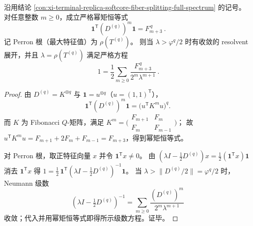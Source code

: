 \begin{conclusion}\label{con:xi-terminal-replica-softcore-fib-moment-and-perron-series}
沿用结论 \ref{con:xi-terminal-replica-softcore-fiber-splitting-full-spectrum} 的记号。
对任意整数 \(m\ge 0\)，成立严格幂矩恒等式
\[
\boxed{\ \mathbf{1}^{\mathsf T}(D^{(q)})^{m}\mathbf{1}=F_{m+3}^{\,q}\ }.
\]
记 Perron 根（最大特征值）为 \(\rho(T^{(q)})\)。
则当 \(\lambda>\varphi^{q}/2\) 时有收敛的 resolvent 展开，并且 \(\lambda=\rho(T^{(q)})\) 满足严格方程
\[
\boxed{\ 1=\frac12\sum_{m\ge 0}\frac{F_{m+3}^{\,q}}{2^{m}\lambda^{m+1}}\ } .
\]
\end{conclusion}
\begin{proof}
由 \(D^{(q)}=K^{\otimes q}\) 与 \(\mathbf{1}=u^{\otimes q}\)（\(u=(1,1)^{\mathsf T}\)），
\[
\mathbf{1}^{\mathsf T}(D^{(q)})^{m}\mathbf{1}
=\bigl(u^{\mathsf T}K^{m}u\bigr)^q.
\]
而 \(K\) 为 Fibonacci \(Q\)-矩阵，满足
\(
K^{m}=\bigl(\begin{smallmatrix}F_{m+1}&F_m\\ F_m&F_{m-1}\end{smallmatrix}\bigr)
\)；
故 \(u^{\mathsf T}K^{m}u=F_{m+1}+2F_m+F_{m-1}=F_{m+3}\)，得到幂矩恒等式。
\par
对 Perron 根，取正特征向量 \(x\) 并令 \(\mathbf{1}^{\mathsf T}x\neq 0\)。
由
\(
(\lambda I-\tfrac12D^{(q)})x=\tfrac12(\mathbf{1}^{\mathsf T}x)\mathbf{1}
\)
消去 \(\mathbf{1}^{\mathsf T}x\) 得
\(
1=\tfrac12\,\mathbf{1}^{\mathsf T}(\lambda I-\tfrac12D^{(q)})^{-1}\mathbf{1}
\)。
当 \(\lambda>\|D^{(q)}/2\|=\varphi^{q}/2\) 时，Neumann 级数
\[
(\lambda I-\tfrac12D^{(q)})^{-1}
=\sum_{m\ge 0}\frac{(D^{(q)})^m}{2^{m}\lambda^{m+1}}
\]
收敛；代入并用幂矩恒等式即得所示级数方程。证毕。
\end{proof}



\endinput

